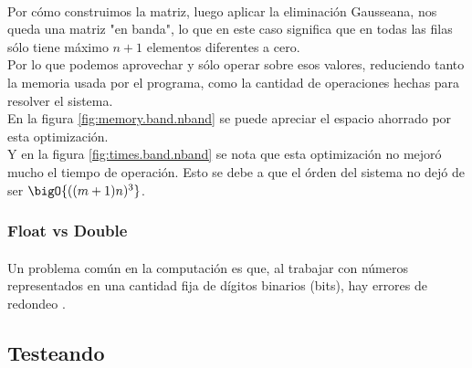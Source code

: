 \documentclass[12pt]{article}
\begin{document}
\paragraph{} Por cómo construimos la matriz, luego aplicar la eliminación Gausseana, nos queda una matriz "en banda", lo que en este caso significa que en todas las filas sólo tiene máximo \(n+1\) elementos diferentes a cero. \\
Por lo que podemos aprovechar y sólo operar sobre esos valores, reduciendo tanto la memoria usada por el programa, como la cantidad de operaciones hechas para resolver el sistema. \\
En la figura \ref{fig:memory.band.nband} se puede apreciar el espacio ahorrado por esta optimización. \\
Y en la figura \ref{fig:times.band.nband} se nota que esta optimización no mejoró mucho el tiempo de operación. Esto se debe a que el órden del sistema no dejó de ser \(\bigO{((m+1)n)^3}\). %


\subsubsection{Float vs Double}
\label{sec:rounding}

\paragraph{} Un problema común en la computación es que, al trabajar con números representados en una cantidad fija de dígitos binarios (bits), hay errores de redondeo \cite{rounding}.%

\subsection{Testeando} %
\end{document}
